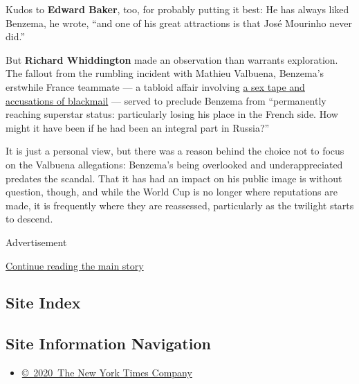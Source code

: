Kudos to \textbf{Edward Baker}, too, for probably putting it best: He
has always liked Benzema, he wrote, ``and one of his great attractions
is that José Mourinho never did.''

But \textbf{Richard Whiddington} made an observation than warrants
exploration. The fallout from the rumbling incident with Mathieu
Valbuena, Benzema's erstwhile France teammate --- a tabloid affair
involving
\href{https://www.theguardian.com/football/2015/nov/04/karim-benzema-arrested-sex-tape-blackmail}{a
sex tape and accusations of blackmail} --- served to preclude Benzema
from ``permanently reaching superstar status: particularly losing his
place in the French side. How might it have been if he had been an
integral part in Russia?''

It is just a personal view, but there was a reason behind the choice not
to focus on the Valbuena allegations: Benzema's being overlooked and
underappreciated predates the scandal. That it has had an impact on his
public image is without question, though, and while the World Cup is no
longer where reputations are made, it is frequently where they are
reassessed, particularly as the twilight starts to descend.

Advertisement

\protect\hyperlink{after-bottom}{Continue reading the main story}

\hypertarget{site-index}{%
\subsection{Site Index}\label{site-index}}

\hypertarget{site-information-navigation}{%
\subsection{Site Information
Navigation}\label{site-information-navigation}}

\begin{itemize}
\tightlist
\item
  \href{https://help.nytimes.com/hc/en-us/articles/115014792127-Copyright-notice}{©~2020~The
  New York Times Company}
\end{itemize}

